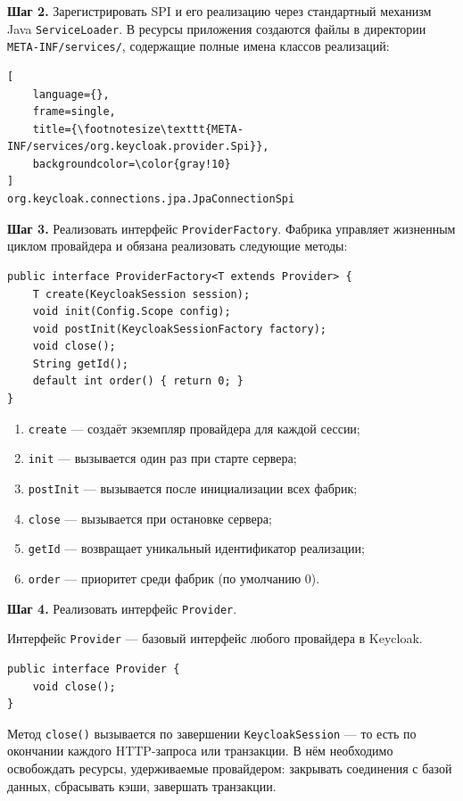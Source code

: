 \documentclass[times]{itmo-student-thesis}
\begin{document}
\textbf{Шаг 2.} Зарегистрировать SPI и его реализацию через стандартный механизм Java \texttt{ServiceLoader}.
В ресурсы приложения создаются файлы в директории \texttt{META-INF/services/}, содержащие полные имена классов реализаций:

\begin{lstlisting}[
    language={},
    frame=single,
    title={\footnotesize\texttt{META-INF/services/org.keycloak.provider.Spi}},
    backgroundcolor=\color{gray!10}
]
org.keycloak.connections.jpa.JpaConnectionSpi
\end{lstlisting}

\textbf{Шаг 3.} Реализовать интерфейс \texttt{ProviderFactory}.
Фабрика управляет жизненным циклом провайдера и обязана реализовать следующие методы:

\begin{lstlisting}
public interface ProviderFactory<T extends Provider> {
    T create(KeycloakSession session);
    void init(Config.Scope config);
    void postInit(KeycloakSessionFactory factory);
    void close();
    String getId();
    default int order() { return 0; }
}
\end{lstlisting}

\begin{enumerate}
    \item \texttt{create} --- создаёт экземпляр провайдера для каждой сессии;
    \item \texttt{init} --- вызывается один раз при старте сервера;
    \item \texttt{postInit} --- вызывается после инициализации всех фабрик;
    \item \texttt{close} --- вызывается при остановке сервера;
    \item \texttt{getId} --- возвращает уникальный идентификатор реализации;
    \item \texttt{order} --- приоритет среди фабрик (по умолчанию 0).
\end{enumerate}

\textbf{Шаг 4.} Реализовать интерфейс \texttt{Provider}.

Интерфейс \texttt{Provider} --- базовый интерфейс любого провайдера в Keycloak.

\begin{lstlisting}
public interface Provider {
    void close();
}
\end{lstlisting}

Метод \texttt{close()} вызывается по завершении \texttt{KeycloakSession} --- то есть по окончании каждого
HTTP-запроса или транзакции. В нём необходимо освобождать ресурсы, удерживаемые провайдером:
закрывать соединения с базой данных, сбрасывать кэши, завершать транзакции.
\end{document}
